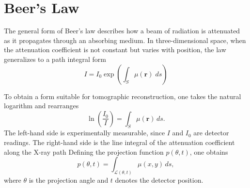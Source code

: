 \documentclass[../../../main.tex]{subfiles}
\begin{document}
\section{Beer's Law}
The general form of Beer’s law describes how a beam of radiation is attenuated as it propagates through an absorbing medium.
In three-dimensional space, when the attenuation coefficient is not constant but varies with position, the law generalizes to a path integral form
\begin{equation*}
    I=I_0\exp \left( \int_S \mu(\mathbf{r })\;ds \right)
\end{equation*}

To obtain a form suitable for tomographic reconstruction, one takes the natural logarithm and rearranges
\begin{equation*}
    \ln\!\left(\frac{I_0}{I}\right) = \int_{S} \mu(\mathbf{r}) \, ds.
\end{equation*}
The left-hand side is experimentally measurable, since $I$ and $I_0$ are detector readings.
The right-hand side is the line integral of the attenuation coefficient along the X-ray path
Defining the projection function $p(\theta, t)$, one obtains
\begin{equation}
    p(\theta, t) 
    = \int_{\mathcal{L}(\theta,t)} \mu(x,y) \, ds,
\end{equation}
where $\theta$ is the projection angle and $t$ denotes the detector position. 
\end{document}
